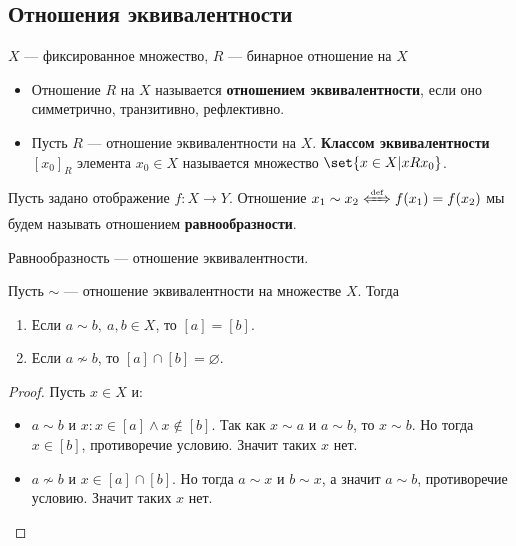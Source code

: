 \documentclass{article}
\begin{document}
\subsection{Отношения эквивалентности}
    
    \begin{definition}
        \label{def:equiv-rel}
        \(X\) --- фиксированное множество, \(R\) --- бинарное отношение на \(X\)
        \begin{itemize}
            \item Отношение \(R\) на \(X\) называется \textbf{отношением эквивалентности}, если оно симметрично, транзитивно, рефлективно.
             \item Пусть \(R\) --- отношение эквивалентности на \(X\). \textbf{Классом эквивалентности} \({[x_0]}_R\) элемента \(x_0 \in X\) называется множество \(\set{x \in X | x R x_0}\). 
        \end{itemize}
    \end{definition}
    
    \begin{definition}
        \label{def:equiv-rel-map}
        Пусть задано отображение \(f: X \rightarrow Y\). Отношение \(x_1 \sim x_2 \xLeftrightarrow[]{\text{\tiny def}} f(x_1) = f(x_2)\) мы будем называть отношением \textbf{равнообразности}.
    \end{definition}
    \begin{remark}
        \label{rem:equiv-rel-map}
        Равнообразность --- отношение эквивалентности. 
    \end{remark}
    
    \begin{proposition}
        \label{prop:equiv-classes-intersect}
        Пусть \(\sim\) --- отношение эквивалентности на множестве \(X\). Тогда 
        \begin{enumerate}
            \item Если \(a \sim b,\ a, b \in X\), то \([a] = [b]\).
            \item Если \(a \not \sim b\), то \([a] \cap [b] = \varnothing\). 
        \end{enumerate}
    \end{proposition}
    \begin{proof}
        Пусть \(x \in X\) и:
        \begin{itemize}
            \item \(a \sim b\) и \(x: x \in [a] \land x \not\in [b]\). Так как \(x \sim a\) и \(a \sim b\), то \(x \sim b\). Но тогда \(x \in [b]\), противоречие условию. Значит таких \(x\) нет. 
            \item \(a \not\sim b\) и \(x \in [a] \cap [b]\). Но тогда \(a \sim x\) и \(b \sim x\), а значит \(a \sim b\), противоречие условию. Значит таких \(x\) нет. 
        \end{itemize}
    \end{proof}
    
\end{document}
